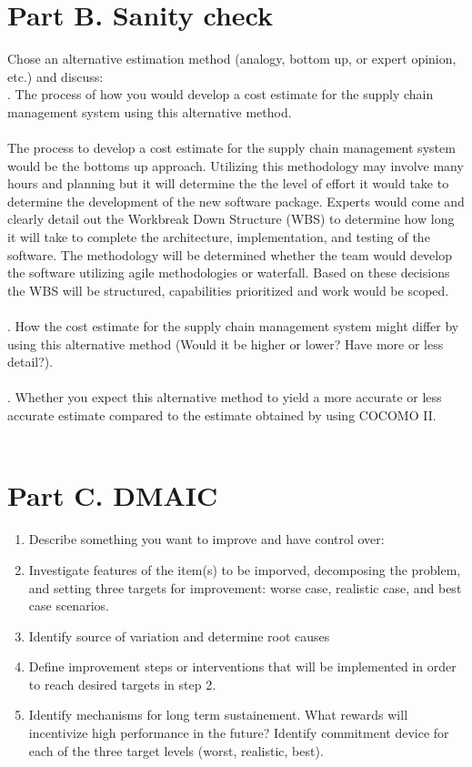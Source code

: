 \documentclass[12pt,letterpaper]{article}
\begin{document}
\section*{Part B. Sanity check}
Chose an alternative estimation method (analogy, bottom up, or expert opinion, etc.) and discuss:\\
\quad {}.	The process of how you would develop a cost estimate for the supply chain management system using this alternative method.\\\\
The process to develop a cost estimate for the supply chain management system would be the bottoms up approach. Utilizing this methodology may involve many hours and planning but it will determine the the level of effort it would take to determine the development of the new software package. Experts would come and clearly detail out the Workbreak Down Structure (WBS) to determine how long it will take to complete the architecture, implementation, and testing of the software. The methodology will be determined whether the team would develop the software utilizing agile methodologies or waterfall. Based on these decisions the WBS will be structured, capabilities prioritized and work would be scoped.\\\\
\quad {}.	How the cost estimate for the supply chain management system might differ by using this alternative method (Would it be higher or lower?  Have more or less detail?).\\\\
\quad {}.	Whether you expect this alternative method to yield a more accurate or less accurate estimate compared to the estimate obtained by using COCOMO II. \\\\
\section*{Part C. DMAIC}
    \begin{enumerate}
        \item Describe something you want to improve and have control over:
        \item Investigate features of the item(s) to be imporved, decomposing the problem, and setting three targets for improvement: worse case, realistic case, and best case scenarios.
        \item Identify source of variation and determine root causes
        \item Define improvement steps or interventions that will be implemented in order to reach desired targets in step 2.
        \item Identify mechanisms for long term sustainement. What rewards will incentivize high performance in the future? Identify commitment device for each of the three target levels (worst, realistic, best).
    \end{enumerate}
\end{document}
